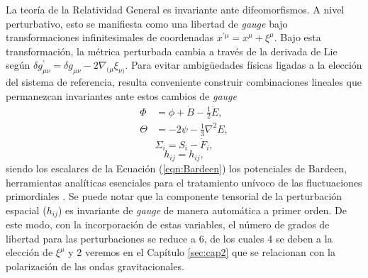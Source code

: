 La teoría de la Relatividad General es invariante ante difeomorfismos. A nivel perturbativo, esto se manifiesta como una libertad de \textit{gauge} bajo transformaciones infinitesimales de coordenadas $x^{\prime \mu} = x^\mu + \xi^\mu$. Bajo esta transformación, la métrica perturbada cambia a través de la derivada de Lie según $\delta g_{\mu\nu}^\prime = \delta g_{\mu\nu} - 2 \nabla_{(\mu} \xi_{\nu)}$. Para evitar ambigüedades físicas ligadas a la elección del sistema de referencia, resulta conveniente construir combinaciones lineales que permanezcan invariantes ante estos cambios de \textit{gauge}
\begin{equation}\label{eqn:Bardeen}
    \begin{aligned}
        \Phi &= \phi + \dot{B} - \frac{1}{2} \ddot{E}, \\
        \Theta &= - 2 \psi - \frac{1}{3} \nabla^2 E,
    \end{aligned}
\end{equation}
\begin{equation}
    \Sigma_i = S_i - \dot{F}_i,
\end{equation}
\begin{equation}
    h_{ij} = h_{ij},
\end{equation}
siendo los escalares de la Ecuación (\ref{eqn:Bardeen}) los potenciales de Bardeen, herramientas analíticas esenciales para el tratamiento unívoco de las fluctuaciones primordiales \cite{Doddelson, Peter_2009}. Se puede notar que la componente tensorial de la perturbación espacial ($h_{ij}$) es invariante de \textit{gauge} de manera automática a primer orden. De este modo, con la incorporación de estas variables, el número de grados de libertad para las perturbaciones se reduce a 6, de los cuales 4 se deben a la elección de $\xi^\mu$ y 2 veremos en el Capítulo \ref{sec:cap2} que se relacionan con la polarización de las ondas gravitacionales.

